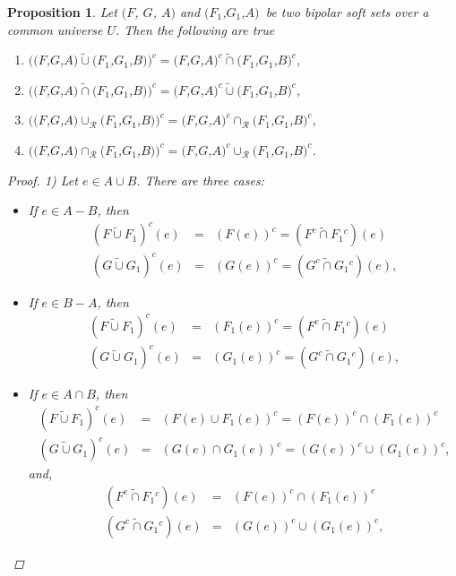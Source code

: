 \documentclass{amsart}
\theoremstyle{plain}
\newtheorem{proposition}{Proposition}
\numberwithin{equation}{section}
\begin{document}
\begin{proposition}
Let $(F$, $G$, $A)$ and $(F_{1}$,$G_{1}$,$A)$\ be two \textit{bipolar} soft
sets over a common universe $U$. Then the following are true

\begin{enumerate}
\item $((F$,$G$,$A)\tilde{\cup}(F_{1}$,$G_{1}$,$B))^{c}=(F$,$G$,$A)^{c}\tilde{\cap}(F_{1}$,$G_{1}$,$B)^{c}$,

\item $((F$,$G$,$A)\tilde{\cap}(F_{1}$,$G_{1}$,$B))^{c}=(F$,$G$,$A)^{c}\tilde{\cup}(F_{1}$,$G_{1}$,$B)^{c}$,

\item $((F$,$G$,$A)\cup _{\mathcal{R}}(F_{1}$,$G_{1}$,$B))^{c}=(F$,$G$,$A)^{c}\cap _{\mathcal{R}}(F_{1}$,$G_{1}$,$B)^{c}$,

\item $((F$,$G$,$A)\cap _{\mathcal{R}}(F_{1}$,$G_{1}$,$B))^{c}=(F$,$G$,$A)^{c}\cup _{\mathcal{R}}(F_{1}$,$G_{1}$,$B)^{c}$.
\end{enumerate}

\begin{proof}
1) Let $e\in A\cup B$. There are three cases:

\begin{itemize}
\item[(i)] If $e\in A-B$, then 
\begin{eqnarray*}
(F\tilde{\cup}F_{1})^{c}(e) &=&(F(e))^{c}=(F^{c}\tilde{\cap}F_{1}{}^{c})(e)
\\
(G\tilde{\cup}G_{1})^{c}(e) &=&(G(e))^{c}=(G^{c}\tilde{\cap}G_{1}{}^{c})(e)\text{,}
\end{eqnarray*}

\item[(ii)] If $e\in B-A$, then 
\begin{eqnarray*}
(F\tilde{\cup}F_{1})^{c}(e) &=&(F_{1}(e))^{c}=(F^{c}\tilde{\cap}F_{1}{}^{c})(e) \\
(G\tilde{\cup}G_{1})^{c}(e) &=&(G_{1}(e))^{c}=(G^{c}\tilde{\cap}G_{1}{}^{c})(e)\text{,}
\end{eqnarray*}

\item[(iii)] If $e\in A\cap B$, then 
\begin{eqnarray*}
(F\tilde{\cup}F_{1})^{c}(e) &=&(F(e)\cup F_{1}(e))^{c}=(F(e))^{c}\cap
(F_{1}(e))^{c} \\
(G\tilde{\cup}G_{1})^{c}(e) &=&(G(e)\cap G_{1}(e))^{c}=(G(e))^{c}\cup
(G_{1}(e))^{c}\text{,}
\end{eqnarray*}and,\begin{eqnarray*}
(F^{c}\tilde{\cap}F_{1}{}^{c})(e) &=&(F(e))^{c}\cap (F_{1}(e))^{c} \\
(G^{c}\tilde{\cap}G_{1}{}^{c})(e) &=&(G(e))^{c}\cup (G_{1}(e))^{c}\text{,}
\end{eqnarray*}
\end{itemize}


\end{proof}
\end{proposition}
\end{document}
